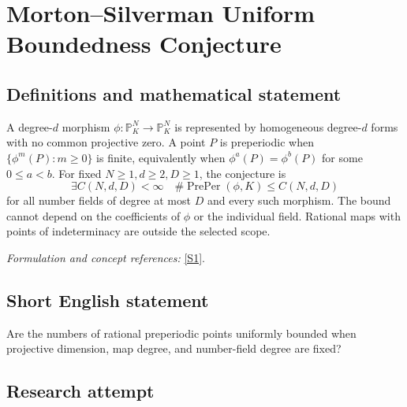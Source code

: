 \documentclass[11pt,a4paper]{article}
\newcommand{\PP}{\mathbb P}
\newcommand{\sref}[2]{\hyperlink{source:#1:#2}{[S#2]}}
\newif\ifshowcatalogue
\newcommand{\cataloguescope}[1]{\ifshowcatalogue
 \paragraph{Exact scope in the supplied catalogue.}
 \begin{quote}\small #1\end{quote}\fi}
\begin{document}
\setcounter{section}{211}
\clearpage
\section{\texorpdfstring{Morton–Silverman Uniform Boundedness Conjecture}{Morton–Silverman Uniform Boundedness Conjecture}}\label{212}
\subsection{Definitions and mathematical statement}
A degree-$d$ morphism $\phi:\PP^N_K\to\PP^N_K$ is represented by homogeneous degree-$d$ forms with no common projective zero. A point $P$ is preperiodic when $\{\phi^m(P):m\ge0\}$ is finite, equivalently when $\phi^a(P)=\phi^b(P)$ for some $0\le a<b$. For fixed $N\ge1,d\ge2,D\ge1$, the conjecture is
\[
 \exists C(N,d,D)<\infty\quad
 \#\operatorname{PrePer}(\phi,K)\le C(N,d,D)
\]
for all number fields of degree at most $D$ and every such morphism. The bound cannot depend on the coefficients of $\phi$ or the individual field. Rational maps with points of indeterminacy are outside the selected scope.
\par\smallskip\textit{Formulation and concept references:} \sref{212}{1}.
\cataloguescope{For all fixed integers N>=1, d>=2 and D>=1, there exists a finite constant C(N,d,D) such that for every number field K with [K:Q]<=D and every degree-d K-morphism phi:P\textasciicircum{}N\_K->P\textasciicircum{}N\_K, the set of K-rational preperiodic points has cardinality at most C(N,d,D). A point is preperiodic when its forward orbit under phi is finite. The morphism is everywhere defined, equivalently given by homogeneous degree-d forms with no common projective zero. The bound is independent of the field and map except for N,d,D; no effective formula or classification is required.}
\subsection{Short English statement}
Are the numbers of rational preperiodic points uniformly bounded when projective dimension, map degree, and number-field degree are fixed?
\subsection{Research attempt}
\end{document}
